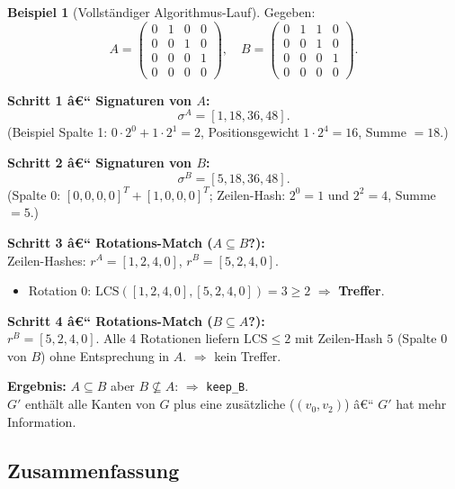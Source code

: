 ﻿\documentclass[12pt,a4paper,twoside]{article}
\theoremstyle{definition}
\newtheorem{beispiel}{Beispiel}[section]
\theoremstyle{plain}
\theoremstyle{remark}
\begin{document}
\begin{beispiel}[Vollständiger Algorithmus-Lauf]
Gegeben:
\[
  A = \begin{pmatrix}
    0 & 1 & 0 & 0 \\
    0 & 0 & 1 & 0 \\
    0 & 0 & 0 & 1 \\
    0 & 0 & 0 & 0
  \end{pmatrix}, \quad
  B = \begin{pmatrix}
    0 & 1 & 1 & 0 \\
    0 & 0 & 1 & 0 \\
    0 & 0 & 0 & 1 \\
    0 & 0 & 0 & 0
  \end{pmatrix}.
\]

\textbf{Schritt 1 â€“ Signaturen von $A$:}
\[
  \sigma^A = [1, 18, 36, 48].
\]
(Beispiel Spalte 1: $0 \cdot 2^0 + 1 \cdot 2^1 = 2$,
Positionsgewicht $1 \cdot 2^4 = 16$,
Summe $= 18$.)

\textbf{Schritt 2 â€“ Signaturen von $B$:}
\[
  \sigma^B = [5, 18, 36, 48].
\]
(Spalte 0: $[0,0,0,0]^T + [1,0,0,0]^T$;
Zeilen-Hash: $2^0 = 1$ und $2^2 = 4$, Summe $= 5$.)

\textbf{Schritt 3 â€“ Rotations-Match ($A \subseteq B$?):}\\
Zeilen-Hashes: $r^A = [1, 2, 4, 0]$,
$r^B = [5, 2, 4, 0]$.
\begin{itemize}
  \item Rotation 0: $\mathrm{LCS}([1,2,4,0], [5,2,4,0]) = 3 \geq 2$
        $\Rightarrow$ \textbf{Treffer}.
\end{itemize}

\textbf{Schritt 4 â€“ Rotations-Match ($B \subseteq A$?):}\\
$r^B = [5, 2, 4, 0]$.
Alle 4 Rotationen liefern $\mathrm{LCS} \leq 2$
mit Zeilen-Hash $5$ (Spalte 0 von $B$) ohne Entsprechung in $A$.
$\Rightarrow$ kein Treffer.

\textbf{Ergebnis:}
$A \subseteq B$ aber $B \not\subseteq A$:
$\Rightarrow$ \texttt{keep\_B}.  \\
$G'$ enthält alle Kanten von $G$ plus eine zusätzliche
($(v_0, v_2)$) â€“ $G'$ hat mehr Information.
\end{beispiel}

\subsection{Zusammenfassung}
\label{sub:sa_summary}
\end{document}

